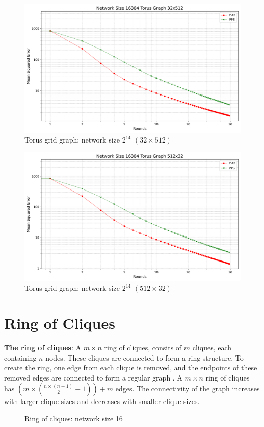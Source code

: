 \begin{figure}[H]
    \centering
    \includegraphics[scale=0.5]{figures/torusGridGraphSimulations/32x512/DAB_vs_PPS_TG_r50_n16384.png}
    \caption{Torus grid graph: network size $2^{14}$ $(32\times512)$}
    \label{fig:16384torusGraph}
\end{figure}

\begin{figure}[H]
    \centering
    \includegraphics[scale=0.5]{figures/torusGridGraphSimulations/512x32/DAB_vs_PPS_TG_r50_n16384.png}
    \caption{Torus grid graph: network size $2^{14}$ $(512\times32)$}
    \label{fig:16384torusGraph}
\end{figure}

\section{Ring of Cliques}
\textbf{The ring of cliques}: A $m \times n$ ring of cliques, consits of $m$ cliques, each containing $n$ nodes. These cliques are connected to form a ring structure. To create the ring, one edge from each clique is removed, and the endpoints of these removed edges are connected to form a regular graph \cite{Mahlmann2010}.  A $m \times n$ ring of cliques has $\left( m\times \left(\frac{n\times (n - 1)}{2}-1 \right) \right) +m$ edges. The connectivity of the graph increases with larger clique sizes and decreases with smaller clique sizes.
\begin{figure}[H]
    \centering
    \scalebox{1}{}
    \caption{Ring of cliques: network size 16}
    \label{fig:ringofcliquesDemo}
\end{figure}

